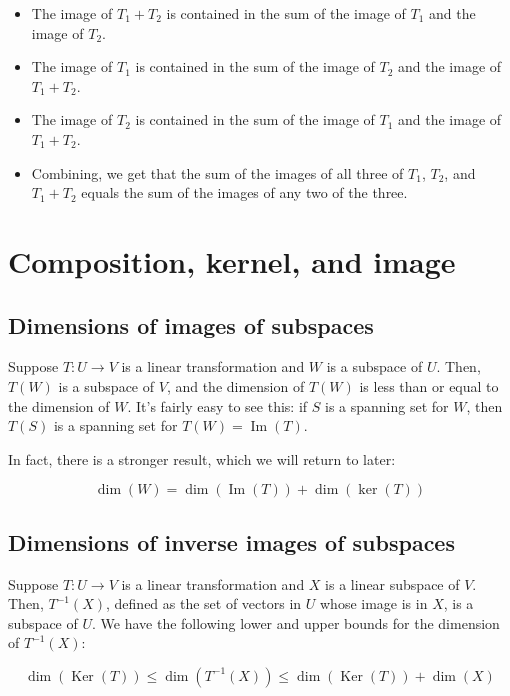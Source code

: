 \documentclass[10pt]{amsart}
\begin{document}
\begin{itemize}
\item The image of $T_1 + T_2$ is contained in the sum of the image of
  $T_1$ and the image of $T_2$.
\item The image of $T_1$ is contained in the sum of the image of $T_2$
  and the image of $T_1 + T_2$.
\item The image of $T_2$ is contained in the sum of the image of $T_1$
  and the image of $T_1 + T_2$.
\item Combining, we get that the sum of the images of all three of
  $T_1$, $T_2$, and $T_1 + T_2$ equals the sum of the images of any
  two of the three.
\end{itemize}

\section{Composition, kernel, and image}

\subsection{Dimensions of images of subspaces}

Suppose $T:U \to V$ is a linear transformation and $W$ is a subspace
of $U$. Then, $T(W)$ is a subspace of $V$, and the dimension of $T(W)$
is less than or equal to the dimension of $W$. It's fairly easy to see
this: if $S$ is a spanning set for $W$, then $T(S)$ is a spanning set
for $T(W) = \operatorname{Im}(T)$.

In fact, there is a stronger result, which we will return to later:

$$\operatorname{dim}(W) = \operatorname{dim}(\operatorname{Im}(T)) + \operatorname{dim}(\operatorname{ker}(T))$$

\subsection{Dimensions of inverse images of subspaces}

Suppose $T:U \to V$ is a linear transformation and $X$ is a linear
subspace of $V$. Then, $T^{-1}(X)$, defined as the set of vectors in
$U$ whose image is in $X$, is a subspace of $U$. We have the following
lower and upper bounds for the dimension of $T^{-1}(X)$:

$$\operatorname{dim}(\operatorname{Ker}(T)) \le \operatorname{dim}(T^{-1}(X)) \le \operatorname{dim}(\operatorname{Ker}(T)) + \operatorname{dim}(X)$$
\end{document}
